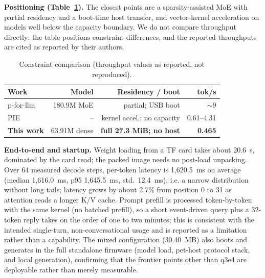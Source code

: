 \documentclass[journal,letterpaper]{IEEEtran}
\begin{document}
\textbf{Positioning (Table~\ref{tab:compare}).} The closest points are a sparsity-assisted MoE
with partial residency and a boot-time host transfer, and vector-kernel acceleration on models
well below the capacity boundary. We do not compare throughput directly: the table positions
constraint differences, and the reported throughputs are cited as reported by their authors.

\begin{table}[t]
\centering
\caption{Constraint comparison (throughput values as reported, not reproduced).}
\label{tab:compare}
\footnotesize
\setlength{\tabcolsep}{2.5pt}
\begin{tabular}{@{}lrrr@{}}
\toprule
Work & Model & Residency / boot & tok/s \\
\midrule
p-for-llm & 180.9M MoE & partial; USB boot & $\sim$9 \\
PIE & -- & kernel accel.; no capacity & 0.61--4.31 \\
\textbf{This work} & 63.91M dense & \textbf{full 27.3 MiB; no host} & \textbf{0.465} \\
\bottomrule
\end{tabular}
\end{table}

\textbf{End-to-end and startup.} Weight loading from a TF card takes about 20.6~s, dominated by
the card read; the packed image needs no post-load unpacking. Over 64 measured decode steps,
per-token latency is 1,620.5~ms on average (median 1,616.0~ms, p95 1,645.5~ms, std.\ 12.4~ms),
i.e. a narrow distribution without long tails; latency grows by about 2.7\% from position 0 to
31 as attention reads a longer K/V cache. Prompt prefill is processed token-by-token with the same
kernel (no batched prefill), so a short event-driven query plus a 32-token reply takes on the
order of one to two minutes; this is consistent with the intended single-turn,
non-conversational usage and is reported as a limitation rather than a capability. The mixed
configuration (30.40~MB) also boots and generates in the full standalone firmware (model load,
pet-host protocol stack, and local generation), confirming that the frontier points other than
q3e4 are deployable rather than merely measurable.
\end{document}
